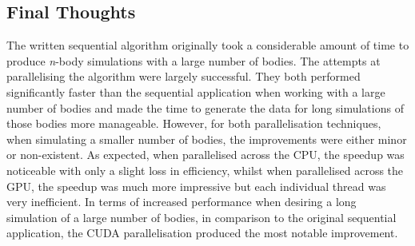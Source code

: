 \documentclass[12pt,journal,transmag]{IEEEtran}
\begin{document}
	\subsection{Final Thoughts}
	The written sequential algorithm originally took a considerable amount of time to produce \textit{n}-body simulations with a large number of bodies. The attempts at parallelising the algorithm were largely successful. They both performed significantly faster than the sequential application when working with a large number of bodies and made the time to generate the data for long simulations of those bodies more manageable. However, for both parallelisation techniques, when simulating a smaller number of bodies, the improvements were either minor or non-existent. As expected, when parallelised across the CPU, the speedup was noticeable with only a slight loss in efficiency, whilst when parallelised across the GPU, the speedup was much more impressive but each individual thread was very inefficient. In terms of increased performance when desiring a long simulation of a large number of bodies, in comparison to the original sequential application, the CUDA parallelisation produced the most notable improvement.
	
	
	
	
\end{document}
